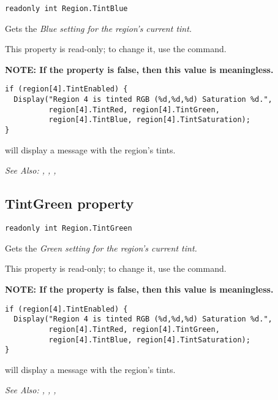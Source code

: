 \begin{verbatim}
readonly int Region.TintBlue
\end{verbatim}
Gets the \it{Blue} setting for the region's current tint.

This property is read-only; to change it, use the  command.

\bf{NOTE:} If the  property is false, then
this value is meaningless.

\begin{verbatim}
if (region[4].TintEnabled) {
  Display("Region 4 is tinted RGB (%d,%d,%d) Saturation %d.",
          region[4].TintRed, region[4].TintGreen,
          region[4].TintBlue, region[4].TintSaturation);
}
\end{verbatim}
will display a message with the region's tints.

\it{See Also:} , ,
, 


\subsection{TintGreen property}\label{Region.TintGreen}%

\begin{verbatim}
readonly int Region.TintGreen
\end{verbatim}
Gets the \it{Green} setting for the region's current tint.

This property is read-only; to change it, use the  command.

\bf{NOTE:} If the  property is false, then
this value is meaningless.

\begin{verbatim}
if (region[4].TintEnabled) {
  Display("Region 4 is tinted RGB (%d,%d,%d) Saturation %d.",
          region[4].TintRed, region[4].TintGreen,
          region[4].TintBlue, region[4].TintSaturation);
}
\end{verbatim}
will display a message with the region's tints.

\it{See Also:} , ,
, 


